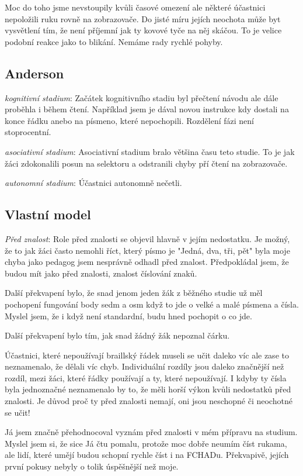 Moc do toho jsme nevstoupily kvůli časové omezení ale některé účastnici nepoložili ruku rovně na zobrazovače.  Do jisté míru jejích neochota může byt vysvětlení tím, že není příjemní jak ty kovové tyče na něj skáčou.  To je velice podobní reakce jako to blikání.  Nemáme rady rychlé pohyby.

\subsection{Anderson}

\textit{kognitivní stadium}: Začátek kognitivního stadiu byl přečtení návodu ale dále proběhla i během čtení.  Například jsem je dával novou instrukce kdy dostali na konce řádku anebo na písmeno, které nepochopili.  Rozdělení fázi není stoprocentní.

\textit{asociativní stadium}: Asociativní stadium bralo většina času teto studie.  To je jak žáci zdokonalili posun na selektoru a odstranili chyby pří čtení na zobrazovače.

\textit{autonomní stadium}: Účastnici autonomně nečetli.

\subsection{Vlastní model}

\textit{Před znalost}:
Role před znalosti se objevil hlavně v jejím nedostatku.
Je možný, že to jak žáci často nemohli říct, který písmo je "Jedná, dva, tři, pět" byla moje chyba jako pedagog jsem nesprávně odhadl před znalost.  Předpokládal jsem, že budou mít jako před znalosti, znalost číslování znaků. 

Další překvapení bylo, že snad jenom jeden žák z běžného studie už měl pochopení fungování body sedm a osm když to jde o velké a malé písmena a čísla.  Myslel jsem, že i když není standardní, budu hned pochopit o co jde.

Další překvapení bylo tím, jak snad žádný žák nepoznal čárku.

Účastnici, které nepoužívají braillský řádek museli se učit daleko víc ale zase to neznamenalo, že dělali víc chyb. Individuální rozdíly jsou daleko značnější než rozdíl, mezi žáci, které řádky používají a ty, které nepoužívají.  I kdyby ty čísla byla jednoznačné neznamenalo by to, že měli horší výkon kvůli nedostatků před znalosti.  Je důvod proč ty před znalosti nemají, oni jsou neschopné či neochotné se učit!

Já jsem značně přehodnocoval vyznám před znalosti v mém přípravu na studium.  Myslel jsem si, že sice Já čtu pomalu, protože moc dobře neumím číst rukama, ale lidí, které umějí budou schopní rychle číst i na FCHADu.  Překvapivě, jejích první pokusy nebyly o tolik úspěšnější než moje.

